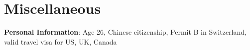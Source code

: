 \section{Miscellaneous}

        \begin{onecolentry}
            \textbf{Personal Information}: Age 26, Chinese citizenship, Permit B in Switzerland, valid travel visa for US, UK, Canada
        \end{onecolentry}




    
